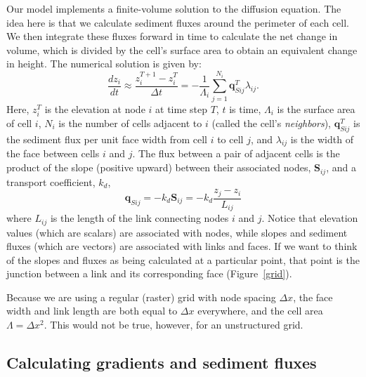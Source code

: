 \documentclass[12pt]{article}
\begin{document}
Our model implements a finite-volume solution to the diffusion equation. The idea here is that we calculate sediment fluxes around the perimeter of each cell. We then integrate these fluxes forward in time to calculate the net change in volume, which is divided by the cell's surface area to obtain an equivalent change in height. The numerical solution is given by:
\begin{equation}
\frac{d z_i}{dt} \approx \frac{z^{T+1}_i-z^T_i}{\Delta t}
= - \frac{1}{\Lambda_i} \sum_{j=1}^{N_i} \mathbf{q}_{Sij}^T \lambda_{ij}.
\label{eq:dzdt}
\end{equation}
Here, $z_i^T$ is the elevation at node $i$ at time step $T$, $t$ is time, $\Lambda_i$ is the surface area of cell $i$, $N_i$ is the number of cells adjacent to $i$ (called the cell's {\em neighbors}), $\mathbf{q}_{Sij}^T$ is the sediment flux per unit face width from cell $i$ to cell $j$, and $\lambda_{ij}$ is the width of the face between cells $i$ and $j$. The flux between a pair of adjacent cells is the product of the slope (positive upward) between their associated nodes, $\mathbf{S}_{ij}$, and a transport coefficient, $k_d$,
\begin{equation}
\mathbf{q}_{Sij} = - k_d \mathbf{S}_{ij} = - k_d \frac{z_j-z_i}{L_{ij}}
\end{equation}
where $L_{ij}$ is the length of the link connecting nodes $i$ and $j$. Notice that elevation values (which are scalars) are associated with nodes, while slopes and sediment fluxes (which are vectors) are associated with links and faces. If we want to think of the slopes and fluxes as being calculated at a particular point, that point is the junction between a link and its corresponding face (Figure~\ref{grid}).

Because we are using a regular (raster) grid with node spacing $\Delta x$, the face width and link length are both equal to $\Delta x$ everywhere, and the cell area $\Lambda=\Delta x^2$. This would not be true, however, for an unstructured grid.

\subsection{Calculating gradients and sediment fluxes}


\end{document}
